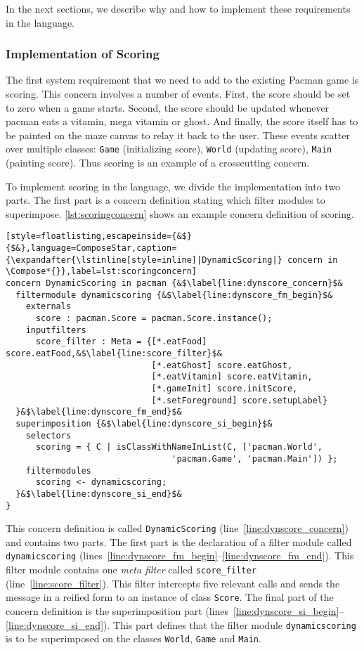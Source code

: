 In the next sections, we describe why and how to implement these requirements in the \Compose* language.

\subsubsection{Implementation of Scoring}
The first system requirement that we need to add to the existing Pacman game is scoring.
This concern involves a number of events.
First, the score should be set to zero when a game starts.
Second, the score should be updated whenever pacman eats a vitamin, mega vitamin or ghost.
And finally, the score itself has to be painted on the maze canvas to relay it back to the user.
These events scatter over multiple classes: \lstinline|Game| (initializing score), \lstinline|World| (updating score), \lstinline|Main| (painting score).
Thus scoring is an example of a crosscutting concern. 

To implement scoring in the \Compose* language, we divide the implementation into two parts.
The first part is a \Compose* concern definition stating which filter modules to superimpose.
\autoref{lst:scoringconcern} shows an example \Compose* concern definition of scoring.

\begin{lstlisting}[style=floatlisting,escapeinside={&$}{$&},language=ComposeStar,caption={\expandafter{\lstinline[style=inline]|DynamicScoring|} concern in \Compose*{}},label=lst:scoringconcern]
concern DynamicScoring in pacman {&$\label{line:dynscore_concern}$&
  filtermodule dynamicscoring {&$\label{line:dynscore_fm_begin}$&
    externals
      score : pacman.Score = pacman.Score.instance();
    inputfilters 
      score_filter : Meta = {[*.eatFood] score.eatFood,&$\label{line:score_filter}$&
                             [*.eatGhost] score.eatGhost,
                             [*.eatVitamin] score.eatVitamin,
                             [*.gameInit] score.initScore,
                             [*.setForeground] score.setupLabel}
  }&$\label{line:dynscore_fm_end}$&
  superimposition {&$\label{line:dynscore_si_begin}$&
    selectors
      scoring = { C | isClassWithNameInList(C, ['pacman.World',
                                 'pacman.Game', 'pacman.Main']) };
    filtermodules
      scoring <- dynamicscoring;
  }&$\label{line:dynscore_si_end}$&
}
\end{lstlisting}

This concern definition is called \lstinline|DynamicScoring| (line~\ref{line:dynscore_concern}) and contains two parts.
The first part is the declaration of a filter module called \lstinline|dynamicscoring| (lines~\ref{line:dynscore_fm_begin}--\ref{line:dynscore_fm_end}).
This filter module contains one \emph{meta filter} called \lstinline|score_filter| (line~\ref{line:score_filter}).
This filter intercepts five relevant calls and sends the message in a reified form to an instance of class \lstinline|Score|.
The final part of the concern definition is the superimposition part (lines~\ref{line:dynscore_si_begin}--\ref{line:dynscore_si_end}).
This part defines that the filter module \lstinline|dynamicscoring| is to be superimposed on the classes \lstinline|World|, \lstinline|Game| and \lstinline|Main|.

